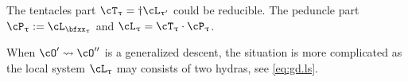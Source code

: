 \documentclass[12pt,a4paper]{amsart}
\newcommand{\bfone}{\mathbf{1}}
\numberwithin{equation}{section}
\theoremstyle{remark}
\def\LLS{\mathrm{{}^{\ell} LS}}
\def\Unip{\mathrm{Unip}}
\def\lUnip{\mathrm{{}^{\ell}Unip}}
\let\ytb=\ytableaushort
\def\cOp{\cO^{\prime}}
\def\cOpp{\cO^{\prime\prime}}
\def\uptaup{\uptau^{\prime}}
\def\uptaupp{\uptau^{\prime\prime}}
\begin{document}
The tentacles part $\cT_{\uptau} = \dagger \cL_{\uptaup}$
could be reducible. The peduncle part $\cP_{\uptau} := \cL_{\bfxx_{\uptau}}$ and
$\cL_{\uptau} = \cT_{\uptau}\cdot \cP_{\uptau}$.


\medskip

When $\cOp\leadsto \cOpp$ is a generalized descent, the situation is more
complicated as the local system $\cL_{\uptau}$ may consists of two hydras, see \eqref{eq:gd.ls}.






\end{document}
